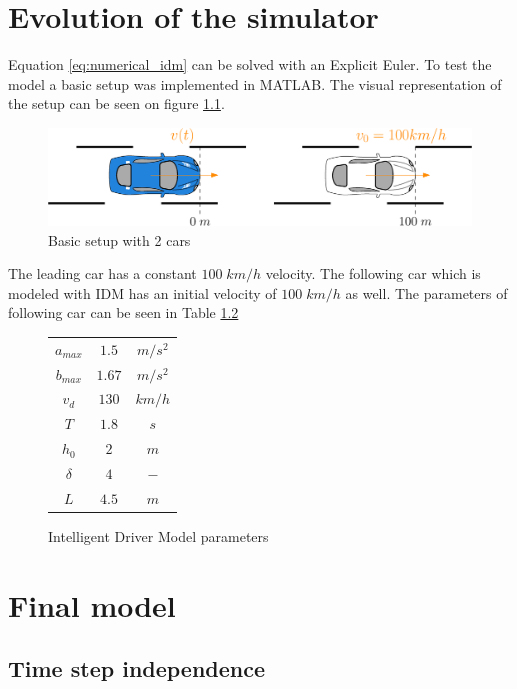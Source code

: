 \documentclass[a4paper,12pt,twoside]{report}
\begin{document}
	\chapter{Evolution of the simulator}
			Equation \ref{eq:numerical_idm} can be solved with an Explicit Euler. To test the model a basic setup was implemented in MATLAB. The visual representation of the setup can be seen on figure \ref{fig:basic2car}.
			\begin{figure}[ht]
				\centering
				\includegraphics[width=\textwidth]{basic_2_car.eps}
				\caption{Basic setup with 2 cars}
				\label{fig:basic2car}
			\end{figure}
			The leading car has a constant $100\;km/h$ velocity. The following car which is modeled with IDM has an initial velocity of $100\;km/h$ as well. The parameters of following car can be seen in Table \ref{table:idm_params}
			\begin{figure}[ht]
				\begin{center}
					\begin{tabular}{ |c|c|c| } 
						\hline
						$a_{max}$ & $1.5$ & $m/s^2$ \\
						$b_{max}$ & $1.67$ & $m/s^2$ \\
						$v_d$ & $130$ & $km/h$ \\
						$T$ & $1.8$ & $s$ \\
						$h_0$ & $2$ & $m$ \\
						$\delta$ & $4$ & $-$ \\
						$L$ & $4.5$ & $m$ \\
						\hline
					\end{tabular}
				\end{center}
				\caption{Intelligent Driver Model parameters}
				\label{table:idm_params}
			\end{figure}
	\chapter{Final model}
		\section{Time step independence}
\end{document}
